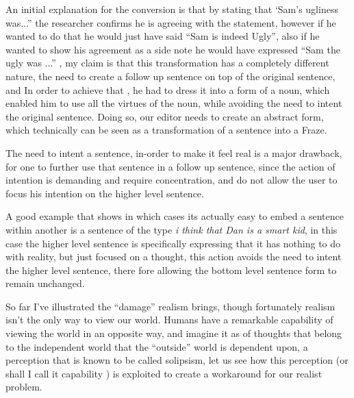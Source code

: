 \documentclass[10pt]{article}
\begin{document}
\par 
An initial explanation for the conversion is that by stating that ‘Sam’s ugliness was...” the researcher confirms he is agreeing with the statement, however if he wanted to do that he would just have said “Sam is indeed Ugly”, also if he wanted to show his agreement as a side note he would have expressed “Sam the ugly was ...” , my claim is that this transformation has a completely different nature, the need to create a follow up sentence on top of the original sentence, and In order to achieve that , he had to dress it into a form of a noun, which enabled him to use all the virtues of the noun, while avoiding the need to intent the original sentence. Doing so, our editor needs to create an abstract form, which technically can be seen as  a transformation of a sentence into a Fraze. 
\par
The need to intent a sentence, in-order to make it feel real is a major drawback, for one to further use that sentence in a follow up sentence, since the action of intention is demanding and require concentration, and do not allow the user to focus his intention on the higher level sentence.\par
\par
A good example that shows in which cases its actually easy to embed a sentence within another  is a sentence of the type \textit{i think that  Dan is a smart kid},  in this case the higher level sentence is specifically expressing that it has nothing to do with reality, but just focused on a thought, this action avoids the need to intent the higher level sentence, there fore allowing the bottom level sentence form to remain unchanged.
\par
So far I've illustrated the “damage” realism brings, though fortunately realism isn’t the only way to view our world. Humans have a remarkable capability of viewing the world in an opposite way, and  imagine it as  of thoughts that belong to the  independent world that the “outside” world is dependent upon, a perception that is known to be called solipsism, let us see how this perception (or shall I call it capability ) is exploited to create a workaround for our realist problem.

\newpage 
\end{document}

